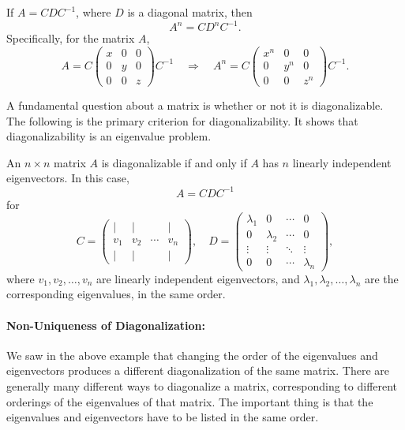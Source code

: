 \documentclass[a4paper,12pt]{article}
\begin{document}
\begin{tcolorbox}[title=Recipe: Compute powers of a diagonalizable matrix,colframe=blue!70!black, colback=blue!5!white]
If \( A = C D C^{-1} \), where \(D\) is a diagonal matrix, then
\[
A^n = C D^n C^{-1}.
\]
Specifically, for the matrix \(A\),
\[
A = C \begin{pmatrix} x & 0 & 0 \\ 0 & y & 0 \\ 0 & 0 & z \end{pmatrix} C^{-1}
\quad \Rightarrow \quad
A^n = C \begin{pmatrix} x^n & 0 & 0 \\ 0 & y^n & 0 \\ 0 & 0 & z^n \end{pmatrix} C^{-1}.
\]
\end{tcolorbox}
A fundamental question about a matrix is whether or not it is diagonalizable. The following is the primary criterion for diagonalizability. It shows that diagonalizability is an eigenvalue problem.

\begin{tcolorbox}[title=Diagonalization Theorem,colframe=blue!70!black, colback=blue!5!white]
An \(n \times n\) matrix \(A\) is diagonalizable if and only if \(A\) has \(n\) linearly independent eigenvectors. In this case, 
\[
A = C D C^{-1}
\]
for 
\[
C = \begin{pmatrix} | & | & & | \\ v_1 & v_2 & \cdots & v_n \\ | & | & & | \end{pmatrix}, \quad 
D = \begin{pmatrix} 
\lambda_1 & 0 & \cdots & 0 \\ 
0 & \lambda_2 & \cdots & 0 \\ 
\vdots & \vdots & \ddots & \vdots \\ 
0 & 0 & \cdots & \lambda_n 
\end{pmatrix},
\]
where \(v_1, v_2, \dots, v_n\) are linearly independent eigenvectors, and \(\lambda_1, \lambda_2, \dots, \lambda_n\) are the corresponding eigenvalues, in the same order.
\end{tcolorbox}

\paragraph{Non-Uniqueness of Diagonalization:} We saw in the above example that changing the order of the eigenvalues and eigenvectors produces a different diagonalization of the same matrix. There are generally many different ways to diagonalize a matrix, corresponding to different orderings of the eigenvalues of that matrix. The important thing is that the eigenvalues and eigenvectors have to be listed in the same order.
\end{document}
